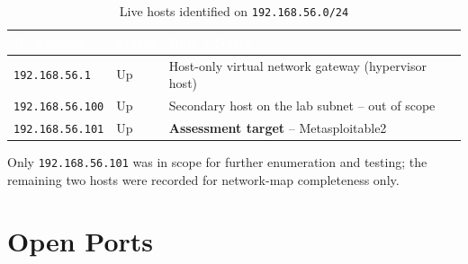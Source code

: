 \documentclass[11pt,a4paper]{article}
\begin{document}
\begin{table}[h!]
\centering
\renewcommand{\arraystretch}{1.4}
\begin{tabular}{p{3.4cm} p{2.8cm} p{7cm}}
\toprule
\rowcolor{navy}
\textcolor{white}{\textbf{IP Address}} & \textcolor{white}{\textbf{Status}} & \textcolor{white}{\textbf{Role / Notes}} \\
\midrule
\texttt{192.168.56.1} & Up & Host-only virtual network gateway (hypervisor host) \\
\texttt{192.168.56.100} & Up & Secondary host on the lab subnet -- out of scope \\
\texttt{192.168.56.101} & Up & \textbf{Assessment target} -- Metasploitable2 \\
\bottomrule
\end{tabular}
\caption{Live hosts identified on \texttt{192.168.56.0/24}}
\end{table}

Only \texttt{192.168.56.101} was in scope for further enumeration and testing; the remaining two hosts were recorded for network-map completeness only.

\section{Open Ports}
\end{document}
